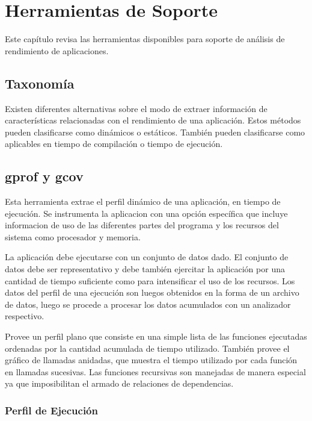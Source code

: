 \documentclass[a4paper]{report}
\begin{document}
\chapter{Herramientas de Soporte}

Este cap\'itulo revisa las herramientas disponibles para soporte de an\'alisis
de rendimiento de aplicaciones.

\section{Taxonom\'ia}

Existen diferentes alternativas sobre el modo de extraer informaci\'on de
caracter\'isticas relacionadas con el rendimiento de una aplicaci\'on.
Estos m\'etodos pueden clasificarse como din\'amicos o est\'aticos.
Tambi\'en pueden clasificarse como aplicables en tiempo de compilaci\'on o
tiempo de ejecuci\'on.


\section{gprof y gcov}

Esta herramienta extrae el perfil din\'amico de una aplicaci\'on, en tiempo
de ejecuci\'on. Se instrumenta la aplicacion con una opci\'on espec\'ifica que
incluye informacion de uso de las diferentes partes del programa y los
recursos del sistema como procesador y memoria.

\bigskip

La aplicaci\'on debe ejecutarse con un conjunto de datos dado. El conjunto de
datos debe ser representativo y debe tambi\'en ejercitar la aplicaci\'on por
una cantidad de tiempo suficiente como para intensificar el uso de los
recursos. Los datos del perfil de una ejecuci\'on son luegos obtenidos en la
forma de un archivo de datos, luego se procede a procesar los datos acumulados
con un analizador respectivo.

\bigskip

Provee un perfil plano que consiste en una simple lista de las funciones
ejecutadas ordenadas por la cantidad acumulada de tiempo utilizado.
Tambi\'en provee el gr\'afico de llamadas anidadas, que muestra el tiempo
utilizado por cada funci\'on en llamadas sucesivas. Las funciones recursivas
son manejadas de manera especial ya que imposibilitan el armado de relaciones
de dependencias.

\subsection{Perfil de Ejecuci\'on}
\end{document}
